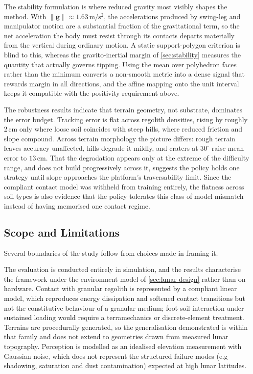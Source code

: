 The stability formulation is where reduced gravity most visibly shapes the method. With $\lVert\boldsymbol{g}\rVert \approx 1.63\,\mathrm{m/s^2}$, the accelerations produced by swing-leg and manipulator motion are a substantial fraction of the gravitational term, so the net acceleration the body must resist through its contacts departs materially from the vertical during ordinary motion. A static support-polygon criterion is blind to this, whereas the gravito-inertial margin of \cref{sec:stability} measures the quantity that actually governs tipping. Using the mean over polyhedron faces rather than the minimum converts a non-smooth metric into a dense signal that rewards margin in all directions, and the affine mapping onto the unit interval keeps it compatible with the positivity requirement above.

The robustness results indicate that terrain geometry, not substrate, dominates the error budget. Tracking error is flat across regolith densities, rising by roughly $2\,$cm only where loose soil coincides with steep hills, where reduced friction and slope compound. Across terrain morphology the picture differs: rough terrain leaves accuracy unaffected, hills degrade it mildly, and craters at $30^\circ$ raise mean error to $13\,$cm. That the degradation appears only at the extreme of the difficulty range, and does not build progressively across it, suggests the policy holds one strategy until slope approaches the platform's traversability limit. Since the compliant contact model was withheld from training entirely, the flatness across soil types is also evidence that the policy tolerates this class of model mismatch instead of having memorised one contact regime.

\subsection{Scope and Limitations}

Several boundaries of the study follow from choices made in framing it.

The evaluation is conducted entirely in simulation, and the results characterise the framework under the environment model of \cref{sec:lunar-design} rather than on hardware. Contact with granular regolith is represented by a compliant linear model, which reproduces energy dissipation and softened contact transitions but not the constitutive behaviour of a granular medium; foot-soil interaction under sustained loading would require a terramechanics or discrete-element treatment. Terrains are procedurally generated, so the generalisation demonstrated is within that family and does not extend to geometries drawn from measured lunar topography. Perception is modelled as an idealised elevation measurement with Gaussian noise, which does not represent the structured failure modes (e.g shadowing, saturation and dust contamination) expected at high lunar latitudes.

